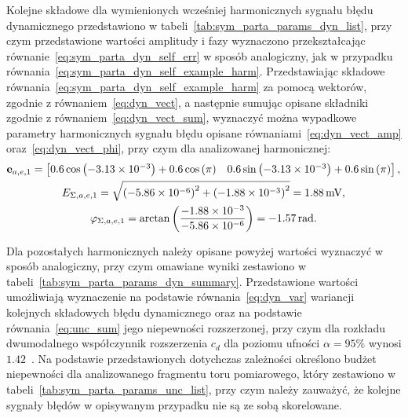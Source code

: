 Kolejne składowe dla wymienionych wcześniej harmonicznych sygnału błędu dynamicznego przedstawiono w tabeli~\ref{tab:sym_parta_params_dyn_list}, przy czym przedstawione wartości amplitudy i fazy wyznaczono przekształcając równanie~\eqref{eq:sym_parta_dyn_self_err} w sposób analogiczny, jak w przypadku równania~\eqref{eq:sym_parta_dyn_self_example_harm}. Przedstawiając składowe równania~\eqref{eq:sym_parta_dyn_self_example_harm} za pomocą wektorów, zgodnie z równaniem~\eqref{eq:dyn_vect}, a następnie sumując opisane składniki zgodnie z równaniem~\eqref{eq:dyn_vect_sum}, wyznaczyć można wypadkowe parametry harmonicznych sygnału błędu opisane równaniami~\eqref{eq:dyn_vect_amp} oraz~\eqref{eq:dyn_vect_phi}, przy czym dla analizowanej harmonicznej:
\begin{gather}
\mathbf{e}_{a,e,1} =
\begin{bmatrix}
0.6 \cos \left(\num{-3.13e-3}\right) + 0.6 \cos \left(\pi\right) & 0.6 \sin \left(\num{-3.13e-3}\right) + 0.6 \sin \left(\pi\right)
\end{bmatrix}
\label{eq:sym_parta_dyn_self_example_sum}, \\
E_{\Sigma,a,e,1} = \sqrt{\left(\num{-5.86e-6}\right)^{2} + \left(\num{-1.88e-3}\right)^{2}} = \qty{1.88}{mV} \label{eq:sym_parta_dyn_self_example_amp}, \\
\varphi_{\Sigma,a,e,1} = \arctan \left(\frac{\num{-1.88e-3}}{\num{-5.86e-6}}\right) = \qty{-1.57}{rad} \label{eq:sym_parta_dyn_self_example_phi}.
\end{gather}

Dla pozostałych harmonicznych należy opisane powyżej wartości wyznaczyć w sposób analogiczny, przy czym omawiane wyniki zestawiono w tabeli~\ref{tab:sym_parta_params_dyn_summary}. Przedstawione wartości umożliwiają wyznaczenie na podstawie równania~\eqref{eq:dyn_var} wariancji kolejnych składowych błędu dynamicznego oraz na podstawie równania~\eqref{eq:unc_sum} jego niepewności rozszerzonej, przy czym dla rozkładu dwumodalnego współczynnik rozszerzenia $c_{d}$ dla poziomu ufności $\alpha = 95\%$ wynosi $1.42$~\cite{jakubiec_system}. Na podstawie przedstawionych dotychczas zależności określono budżet niepewności dla analizowanego fragmentu toru pomiarowego, który zestawiono w tabeli~\ref{tab:sym_parta_params_unc_list}, przy czym należy zauważyć, że kolejne sygnały błędów w opisywanym przypadku nie są ze sobą skorelowane.

